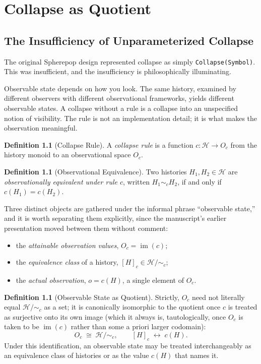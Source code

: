 \documentclass[12pt, a4paper, openany]{book}
\theoremstyle{plain}
\theoremstyle{definition}
\newtheorem{definition}[theorem]{Definition}
\theoremstyle{remark}
\newcommand{\calH}{\mathcal{H}}
\begin{document}
\chapter{Collapse as Quotient}

\section{The Insufficiency of Unparameterized Collapse}

The original Spherepop design represented collapse as simply \texttt{Collapse(Symbol)}.
This was insufficient, and the insufficiency is philosophically illuminating.

Observable state depends on how you look. The same history, examined by different
observers with different observational frameworks, yields different observable
states. A collapse without a rule is a collapse into an unspecified notion of
visibility. The rule is not an implementation detail; it is what makes the
observation meaningful.

\begin{definition}[Collapse Rule]
A \emph{collapse rule} is a function $c : \calH \to O_c$ from the history monoid
to an observational space $O_c$.
\end{definition}

\begin{definition}[Observational Equivalence]
Two histories $H_1, H_2 \in \calH$ are \emph{observationally equivalent under
rule $c$}, written $H_1 \sim_c H_2$, if and only if $c(H_1) = c(H_2)$.
\end{definition}

Three distinct objects are gathered under the informal phrase ``observable
state,'' and it is worth separating them explicitly, since the manuscript's
earlier presentation moved between them without comment:

\begin{itemize}
\item the \emph{attainable observation values}, $O_c = \operatorname{im}(c)$;
\item the \emph{equivalence class} of a history, $[H]_c \in \calH / {\sim_c}$;
\item the \emph{actual observation}, $o = c(H)$, a single element of $O_c$.
\end{itemize}

\begin{definition}[Observable State as Quotient]
Strictly, $O_c$ need not literally equal $\calH / {\sim_c}$ as a set; it is
canonically isomorphic to the quotient once $c$ is treated as surjective onto
its own image (which it always is, tautologically, once $O_c$ is taken to be
$\operatorname{im}(c)$ rather than some a priori larger codomain):
\[
O_c \;\cong\; \calH / {\sim_c}, \qquad [H]_c \;\longleftrightarrow\; c(H).
\]
Under this identification, an observable state may be treated interchangeably
as an equivalence class of histories or as the value $c(H)$ that names it.
\end{definition}
\end{document}
